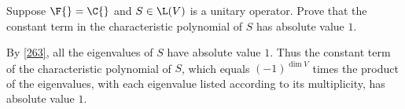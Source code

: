 \exercise
Suppose $\F{} = \C{}$ and $S \in \L(V)$ is a unitary operator. Prove that the constant term in the characteristic polynomial of $S$ has absolute value $1$.

\begin{Solution}
By \ref{263}, all the eigenvalues of $S$ have absolute value $1$. Thus the constant term of the characteristic polynomial of $S$, which equals $(-1)^{\dim V}$ times the product of the eigenvalues, with each eigenvalue listed according to its multiplicity, has absolute value $1$.
\end{Solution}

